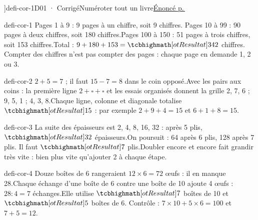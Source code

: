 \editionPage[\pdfbookmark[0]{Corrigés des défis}{bm-defi-cor-1-parent}]{defi-cor-1}{D01 · Corrigé}{Numéroter tout un livre}{\hyperref[defi-ex-1]{Énoncé p.\,\pageref*{defi-ex-1}}}
\begin{blocEdition}{defi-cor-1}
Pages 1 à 9 : 9 pages à un chiffre, soit 9 chiffres. Pages 10 à 99 : 90 pages à deux chiffres, soit 180 chiffres.Pages 100 à 150 : 51 pages à trois chiffres, soit 153 chiffres.Total : $9+180+153=\res{342}$ chiffres. Compter des chiffres n’est pas compter des pages : chaque page en demande 1, 2 ou 3.
\end{blocEdition}
\begin{blocEdition}{defi-cor-2}
$2+5=7$ ; il faut $15-7=8$ dans le coin opposé.Avec les pairs aux coins : la première ligne $2+\square+\square$ et les essais organisés donnent la grille 2, 7, 6 ; 9, 5, 1 ; 4, 3, 8.Chaque ligne, colonne et diagonale totalise $\res{15}$ : par exemple $2+9+4=15$ et $6+1+8=15$.
\end{blocEdition}
\begin{blocEdition}{defi-cor-3}
La suite des épaisseurs est 2, 4, 8, 16, 32 : après 5 plis, $\res{32}$ épaisseurs.On poursuit : 64 après 6 plis, 128 après 7 plis. Il faut $\res7$ plis.Doubler encore et encore fait grandir très vite : bien plus vite qu’ajouter 2 à chaque étape.
\end{blocEdition}
\begin{blocEdition}{defi-cor-4}
Douze boîtes de 6 rangeraient $12\times6=72$ œufs : il en manque 28.Chaque échange d’une boîte de 6 contre une boîte de 10 ajoute 4 œufs : $28:4=7$ échanges.Elle utilise $\res{7}$ boîtes de 10 et $\res{5}$ boîtes de 6. Contrôle : $7\times10+5\times6=100$ et $7+5=12$.
\end{blocEdition}
